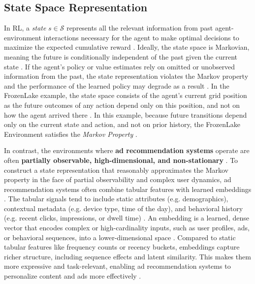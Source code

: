 \documentclass[final]{anthology-ch}         %
\begin{document}
\subsection{State Space Representation} \label{state_space_representation}

In RL, a \textit{state} $s \in \mathcal{S}$  represents all the relevant information from past agent-environment interactions necessary for the agent to make optimal decisions to maximize the expected cumulative reward \cite{Sutton1998}. Ideally, the state space is Markovian, meaning the future is conditionally independent of the past given the current state \cite{russell2016artificial, Sutton1998}. If the agent’s policy or value estimates rely on omitted or unobserved information from the past, the state representation violates the Markov property and the performance of the learned policy may degrade as a result \cite{russell2016artificial, Sutton1998}. In the FrozenLake example, the state space consists of the agent’s current grid position as the future outcomes of any action depend only on this position, and not on how the agent arrived there \cite{frozenlake}. In this example, because future transitions depend only on the current state and action, and not on prior history, the FrozenLake Environment satisfies the \textit{Markov Property} \cite{Sutton1998, frozenlake}.  


In contrast, the environments where \textbf{ad recommendation systems} operate are often \textbf{partially observable, high-dimensional, and non-stationary} \cite{dulac2021challenges, russell2016artificial}. To construct a state representation that reasonably approximates the Markov property in the face of partial observability and complex user dynamics, ad recommendation systems often combine tabular features with learned embeddings \cite{afsar2022reinforcement, kaelbling1998planning}. The tabular signals tend to include static attributes (e.g. demographics), contextual metadata (e.g. device type, time of the day), and behavioral history (e.g. recent clicks, impressions, or dwell time) \cite{cheng2016wide, covington2016deep}. An embedding is a learned, dense vector that encodes complex or high-cardinality inputs, such as user profiles, ads, or behavioral sequences, into a lower-dimensional space \cite{cheng2016wide}. Compared to static tabular features like frequency counts or recency buckets, embeddings capture richer structure, including sequence effects and latent similarity. This makes them more expressive and task-relevant, enabling ad recommendation systems to personalize content and ads more effectively \cite{covington2016deep, cheng2016wide}.
\end{document}
